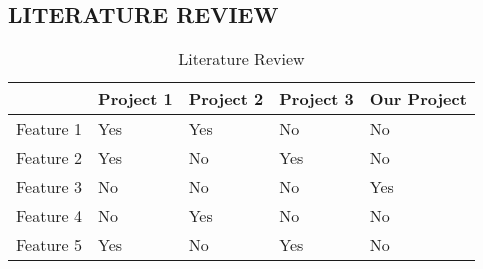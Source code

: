 \begin{center}
	\chapter{LITERATURE REVIEW}
\end{center}

\par
\lipsum[4]
\vspace{1cm}

\begin{table}[h!]
  \begin{center}
    \label{tab:table1}
    \begin{tabular}{|l|l|l|l|l|} 
    \hline
      & Project 1 & Project 2 & Project 3 & Our Project \\
      \hline
Feature 1 & Yes       & Yes       & No        & No        \\
Feature 2 & Yes       & No        & Yes       & No        \\
Feature 3 & No        & No        & No        & Yes       \\
Feature 4 & No        & Yes       & No        & No        \\
Feature 5 & Yes       & No        & Yes       & No        \\
	\hline
    \end{tabular}
    \caption{Literature Review}
  \end{center}
\end{table}

\lipsum[4]
